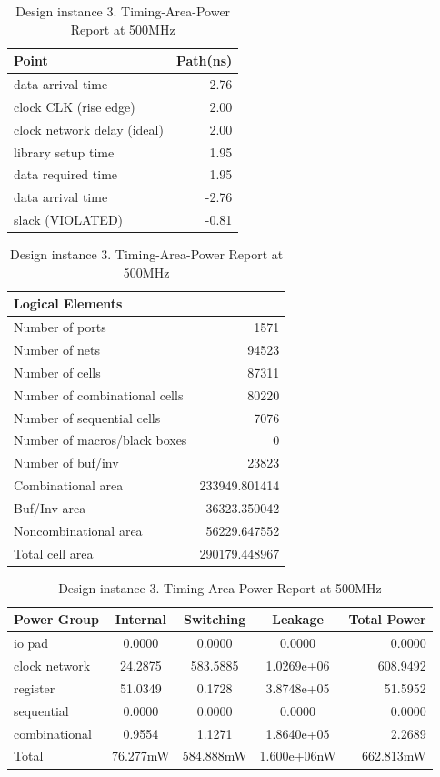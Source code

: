 \documentclass[journal,comsoc]{IEEEtran}
\begin{document}
\begin{table}[t!]
	\centering
	\caption{Design instance 3. Timing-Area-Power Report at 500MHz}
	\label{tab:reporte4} 	
	\begin{tabular}{@{}lr@{}}
		Point 						&Path(ns)\\
		\hline\hline
		data arrival time   		&2.76\\ 
		clock CLK (rise edge)  		&2.00\\
		clock network delay (ideal) &2.00\\
		library setup time			&1.95\\
		\hline
		data required time			&1.95\\
		data arrival time           &-2.76\\
		\hline
		slack (VIOLATED)            &-0.81\\	
		\hline
	\end{tabular}
	
	\begin{tabular}{@{}lr@{}}\\
		Logical Elements\\
		\hline\hline
		Number of ports                &1571\\
		Number of nets                 &94523\\
		Number of cells                &87311\\
		Number of combinational cells  &80220\\
		Number of sequential cells     &7076\\
		Number of macros/black boxes   &0\\
		Number of buf/inv              &23823\\
		\hline
		Combinational area             &233949.801414\\
		Buf/Inv area                   &36323.350042\\
		Noncombinational area          &56229.647552\\
		\hline
		Total cell area                &290179.448967\\	
		\hline
	\end{tabular}
	
	\begin{tabular}{@{}lcccr@{}}\\
		Power Group		 &Internal 	&Switching 	&Leakage		&Total Power\\
		\hline\hline
		io pad           &0.0000    &0.0000     &0.0000    		&0.0000\\
		clock network    &24.2875   &583.5885   &1.0269e+06 	&608.9492\\
		register         &51.0349   &0.1728     &3.8748e+05 	&51.5952\\  
		sequential       &0.0000    &0.0000     &0.0000     	&0.0000\\  
		combinational    &0.9554    &1.1271     &1.8640e+05 	&2.2689\\ 
		\hline
		Total            &76.277mW  &584.888mW  &1.600e+06nW	&662.813mW\\	
		\hline
	\end{tabular}
\end{table}
\end{document}
